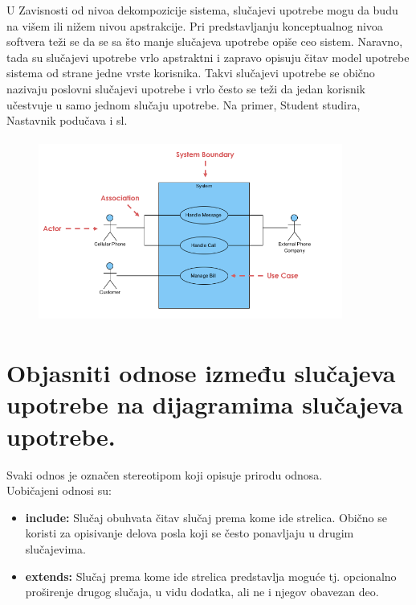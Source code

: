 \documentclass[a4paper]{article}
\begin{document}
  U Zavisnosti od nivoa dekompozicije sistema, slučajevi upotrebe mogu da budu
  na višem ili nižem nivou apstrakcije. Pri predstavljanju konceptualnog nivoa
  softvera teži se da se sa što manje slučajeva upotrebe opiše ceo sistem. Naravno, tada
  su slučajevi upotrebe vrlo apstraktni i zapravo opisuju čitav model upotrebe sistema
  od strane jedne vrste korisnika. Takvi slučajevi upotrebe se obično nazivaju poslovni
  slučajevi upotrebe i vrlo često se teži da jedan korisnik učestvuje u samo jednom
  slučaju upotrebe. Na primer, Student studira, Nastavnik podučava i sl.\\
  \begin{figure}[H]
    \begin{center}
        \includegraphics[width=100mm,height=60mm]{Slike/uml_slucaj_upotrebe.png}
    \end{center}
  \end{figure}

\newpage

\section{Objasniti odnose između slučajeva upotrebe na dijagramima slučajeva upotrebe.}
Svaki odnos je označen stereotipom koji opisuje prirodu odnosa.\\

Uobičajeni odnosi su:
\begin{itemize}
  \item \textbf{include:} Slučaj obuhvata čitav slučaj prema kome ide strelica. Obično se koristi za opisivanje delova posla koji se često ponavljaju u drugim slučajevima.
  
  \item \textbf{extends:} Slučaj prema kome ide strelica predstavlja moguće tj. opcionalno proširenje drugog slučaja, u vidu dodatka, ali ne i njegov obavezan deo.
\end{itemize}
\end{document}

